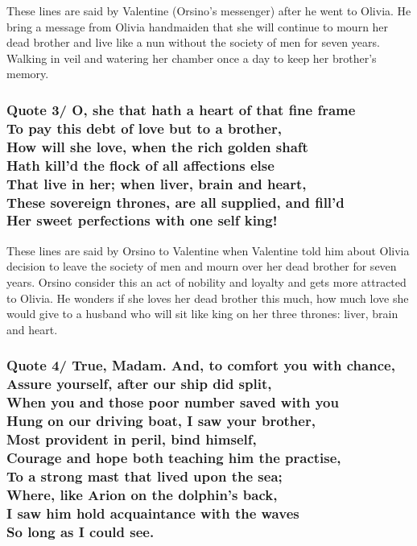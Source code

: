 \documentclass[12pt, a4paper]{article}
\begin{document}
These lines are said by Valentine (Orsino's messenger) after he went
to Olivia. He bring a message from Olivia handmaiden that she will 
continue to mourn her dead brother and live like a nun without the 
society of men for seven years. Walking in veil and watering her 
chamber once a day to keep her brother's memory.

\subsubsection*{Quote 3/
  O, she that hath a heart of that fine frame\\
  To pay this debt of love but to a brother,\\
	How will she love, when the rich golden shaft\\
	Hath kill'd the flock of all affections else\\
	That live in her; when liver, brain and heart,\\
	These sovereign thrones, are all supplied, and fill'd\\
	Her sweet perfections with one self king!
}

These lines are said by Orsino to Valentine when Valentine told him
about Olivia decision to leave the society of men and mourn over her
dead brother for seven years. Orsino consider this an act of nobility and
loyalty and gets more attracted to Olivia. He wonders if she loves her
dead brother this much, how much love she would give to a husband who 
will sit like king on her three thrones: liver, brain and heart.

\subsubsection*{Quote 4/
  True, Madam. And, to comfort you with chance,\\
  Assure yourself, after our ship did split,\\
	When you and those poor number saved with you	\\
	Hung on our driving boat, I saw your brother,\\
	Most provident in peril, bind himself,\\
	Courage and hope both teaching him the practise,\\
	To a strong mast that lived upon the sea;\\
	Where, like Arion on the dolphin's back,\\
	I saw him hold acquaintance with the waves\\
	So long as I could see.
}
\end{document}
